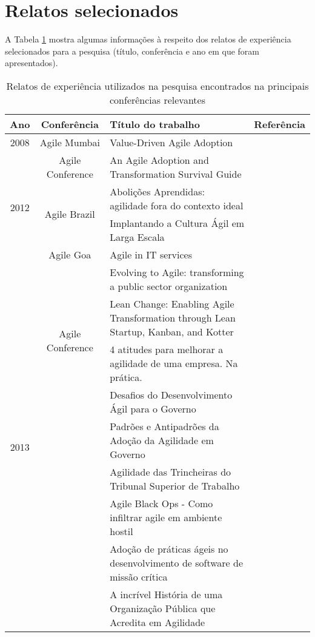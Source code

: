 	\section{Relatos selecionados}
		A Tabela \ref{tab:relatosEncontrados} mostra algumas informações à respeito dos relatos de experiência selecionados para a pesquisa (título, conferência e ano em que foram apresentados).
		\begin{table}[h]
			\centering
			\captionsetup{justification=centering,margin=1cm}
			\begin{tabular}{| c | c | m{8cm} | m{2.5cm} |} \hline \textbf{Ano} & \textbf{Conferência}  & \textbf{Título do trabalho} & \textbf{Referência} \\ \hline
				\multirow{1}{*}{2008}
					& Agile Mumbai & Value-Driven Agile Adoption & \cite{Ahmed2008} \\ \cline{2-4}
				\hline \hline
				\multirow{4}{*}{2012}
					& \multirow{1}{*}{Agile Conference}
						& An Agile Adoption and Transformation Survival Guide & \cite{Sahota2012} \\ \cline{2-4}
					& \multirow{2}{*}{Agile Brazil}
						& Abolições Aprendidas: agilidade fora do contexto ideal & \cite{Piegas2012} \\ \cline{3-4}
						&& Implantando a Cultura Ágil em Larga Escala & \cite{Parzinello2012} \\ \cline{2-4}
					& \multirow{1}{*}{Agile Goa}
						& Agile in IT services & \cite{Srinath2012} \\ \cline{2-4}
				\hline \hline
				\multirow{18}{*}{2013}
					& \multirow{4}{*}{Agile Conference}
						& Evolving to Agile: transforming a public sector organization & \cite{Karaj2013} \\ \cline{3-4}
						&& Lean Change: Enabling Agile Transformation through Lean Startup, Kanban, and Kotter & \cite{Hui2013} \\ \cline{2-4}
					& \multirow{12}{*}{Agile Brazil}
						& 4 atitudes para melhorar a agilidade de uma empresa. Na prática. & \cite{Valerio2013} \\ \cline{3-4}
						&& Desafios do Desenvolvimento Ágil para o Governo & \cite{Stefano2013} \\ \cline{3-4}
						&& Padrões e Antipadrões da Adoção da Agilidade em Governo & \cite{Rodrigues2013} \\ \cline{3-4}
						&& Agilidade das Trincheiras do Tribunal Superior de Trabalho & \cite{Vieira2013} \\ \cline{3-4}
						&& Agile Black Ops - Como infiltrar agile em ambiente hostil & \cite{Queiroz2013} \\ \cline{3-4}
						&& Adoção de práticas ágeis no desenvolvimento de software de missão crítica & \cite{Bastos2013} \\ \cline{3-4}
						&& A incrível História de uma Organização Pública que Acredita em Agilidade & \cite{Maciel2013} \\ \cline{2-4}
				\hline
			\end{tabular}
			\caption{Relatos de experiência utilizados na pesquisa encontrados na principais conferências relevantes}
			\label{tab:relatosEncontrados}
		\end{table}
